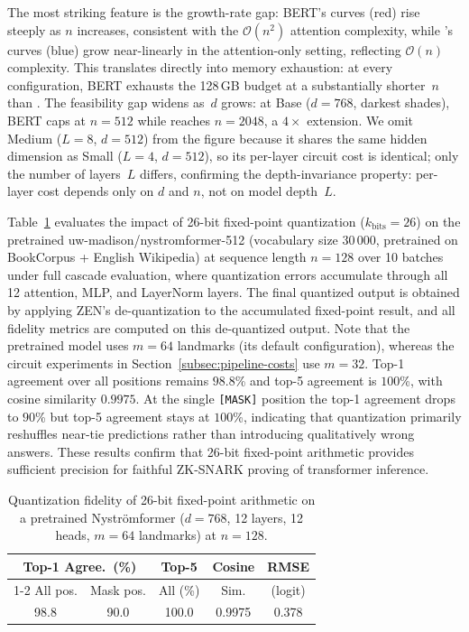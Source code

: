 \documentclass[sigconf,anonymous,review,balance=false]{acmart}
\newcommand{\rev}[1]{{\color{magenta}#1}}
\begin{document}
The most striking feature is the growth-rate gap: BERT's curves (red) rise steeply as $n$ increases, consistent with the \rev{$\mathcal{O}(n^2)$} attention complexity, while \nystrom's curves (blue) grow near-linearly in the attention-only setting, reflecting \rev{$\mathcal{O}(n)$} complexity. This translates directly into memory exhaustion: at every configuration, BERT exhausts the 128\,GB budget at a substantially shorter~$n$ than \nystrom. The feasibility gap widens as~$d$ grows: at Base ($d{=}768$, darkest shades), BERT caps at $n{=}512$ while \nystrom reaches $n{=}2048$, a $4{\times}$ extension. We omit Medium ($L{=}8$, $d{=}512$) from the figure because it shares the same hidden dimension as Small ($L{=}4$, $d{=}512$), so its per-layer circuit cost is identical; only the number of layers~$L$ differs, confirming the depth-invariance property: per-layer cost depends only on $d$ and $n$, not on model depth~$L$.

\label{subsec:quantization-fidelity}
Table~\ref{tab:quantization} evaluates the impact of 26-bit fixed-point quantization ($k_\text{bits}{=}26$) on the pretrained uw-madison/nystromformer-512 (vocabulary size 30\,000, pretrained on BookCorpus + English Wikipedia) at sequence length $n{=}128$ over 10 batches under full cascade evaluation, where quantization errors accumulate through all 12 attention, MLP, and LayerNorm layers. The final quantized output is obtained by applying ZEN's de-quantization to the accumulated fixed-point result, and all fidelity metrics are computed on this de-quantized output. Note that the pretrained model uses $m{=}64$ landmarks (its default configuration), whereas the circuit experiments in Section~\ref{subsec:pipeline-costs} use $m{=}32$.
Top-1 agreement over all positions remains $98.8$\% and top-5 agreement is $100$\%, with cosine similarity $0.9975$. At the single \texttt{[MASK]} position the top-1 agreement drops to $90$\% but top-5 agreement stays at $100$\%, indicating that quantization primarily reshuffles near-tie predictions rather than introducing qualitatively wrong answers. These results confirm that 26-bit fixed-point arithmetic provides sufficient precision for faithful ZK-SNARK proving of transformer inference.

\begin{table}[!ht]
\centering
\caption{Quantization fidelity of 26-bit fixed-point arithmetic on a pretrained Nystr\"omformer ($d{=}768$, 12 layers, 12 heads, $m{=}64$ landmarks) at $n{=}128$.}
\label{tab:quantization}
\small
\setlength{\tabcolsep}{4pt}
\begin{tabular}{@{} ccc cc @{}}
\toprule
\multicolumn{2}{c}{Top-1 Agree.\ (\%)} & Top-5 & Cosine & RMSE \\
\cmidrule(lr){1-2}
All pos. & Mask pos. & All (\%) & Sim. & (logit) \\
\midrule
98.8 & 90.0 & 100.0 & 0.9975 & 0.378 \\
\bottomrule
\end{tabular}
\end{table}
\end{document}
